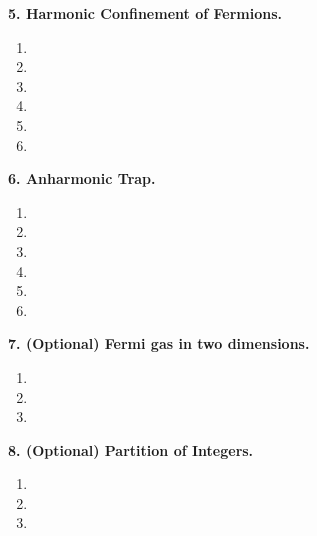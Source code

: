 \documentclass{article}
\theoremstyle{definition}
\begin{document}
\noindent \textbf{5. Harmonic Confinement of Fermions.}


\begin{enumerate}[label=(\alph*)]
	\item 
	
	\item 
	
	\item 
	
	\item 
	
	\item 
	
	\item 
\end{enumerate}


\noindent \textbf{6. Anharmonic Trap.}

\begin{enumerate}[label=(\alph*)]
	\item 
	
	\item 
	
	\item 
	
	\item 
	
	\item 
	
	\item 
\end{enumerate}


\noindent \textbf{7. (Optional) Fermi gas in two dimensions.}

\begin{enumerate}[label=(\alph*)]
	\item 
	
	\item 
	
	\item 
	
\end{enumerate}


\noindent \textbf{8. (Optional) Partition of Integers.}

\begin{enumerate}[label=(\alph*)]
	\item 
	
	\item 
	
	\item 
	
\end{enumerate}
\end{document}
